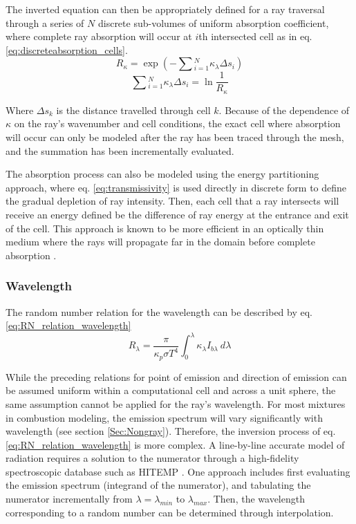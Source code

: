 The inverted equation can then be appropriately defined for a ray traversal through a series of $N$ discrete sub-volumes of uniform absorption coefficient, where complete ray absorption will occur at $i$th intersected cell as in eq. \ref{eq:discreteabsorption_cells}.
\begin{equation}
    R_\kappa{}=\exp{\left(-\sum{}_{i=1}^N\kappa_\lambda{}\Delta{}s_i\right)}
\end{equation}
\begin{equation}
    \sum{}_{i=1}^N\kappa_\lambda{}\Delta{s_i}=\ln{\frac{1}{R_\kappa{}}}
    \label{eq:discreteabsorption_cells}
\end{equation}

Where $\Delta{s_k}$ is the distance travelled through cell $k$. Because of the dependence of $\kappa{}$ on the ray's wavenumber and cell conditions, the exact cell where absorption will occur can only be modeled after the ray has been traced through the mesh, and the summation has been incrementally evaluated.

The absorption process can also be modeled using the energy 
partitioning approach, where eq. \ref{eq:transmissivity} is used directly in discrete form to define the gradual depletion of ray intensity. 
Then, each cell that a ray intersects will receive an energy defined be the difference of ray energy at the entrance and exit of the cell.
This approach is known to be more efficient in an optically thin medium where the rays will propagate far in the domain before complete absorption \cite{Modest2013RadiativeTransfer,Liu2020TheFlames}.

\subsubsection{Wavelength}
The random number relation for the wavelength can be described by eq. \ref{eq:RN_relation_wavelength}
\begin{equation}
    R_\lambda{}=\frac{\pi{}}{\kappa{}_p\sigma{}T^4}\int_0^\lambda{}\kappa{}_\lambda{}I_{b\lambda{}}~d\lambda{}
    \label{eq:RN_relation_wavelength}
\end{equation}

While the preceding relations for point of emission and direction of emission can be assumed uniform within a computational cell and across a unit sphere, the same assumption cannot be applied for the ray's wavelength. For most mixtures in combustion modeling, the emission spectrum will vary significantly with wavelength (see section \ref{Sec:Nongray}). 
Therefore, the inversion process of eq. \ref{eq:RN_relation_wavelength} is more complex.
A line-by-line accurate model of radiation requires a solution to the numerator through a high-fidelity spectroscopic database such as HITEMP \cite{Rothman2010HITEMPDatabase}.
One approach includes first evaluating the emission spectrum (integrand of the numerator), and tabulating the numerator incrementally from $\lambda{}=\lambda{}_{min}$ to $\lambda{}_{max}$.
Then, the wavelength corresponding to a random number can be determined through interpolation.

